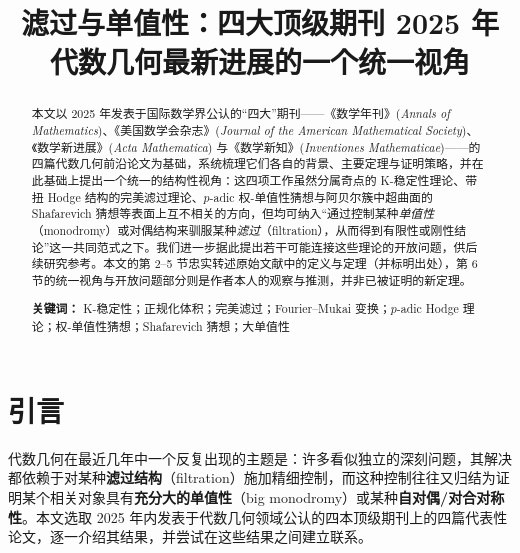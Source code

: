 \documentclass[11pt,a4paper]{article}
\title{\textbf{滤过与单值性：四大顶级期刊 2025 年代数几何最新进展的一个统一视角}}
\author{}
\date{}
\theoremstyle{definition}
\theoremstyle{remark}
\begin{document}
\maketitle
\vspace{-1.5em}

\begin{abstract}
本文以 2025 年发表于国际数学界公认的“四大”期刊——《数学年刊》(\emph{Annals of Mathematics})、《美国数学会杂志》(\emph{Journal of the American Mathematical Society})、《数学新进展》(\emph{Acta Mathematica}) 与《数学新知》(\emph{Inventiones Mathematicae})——的四篇代数几何前沿论文为基础，系统梳理它们各自的背景、主要定理与证明策略，并在此基础上提出一个统一的结构性视角：这四项工作虽然分属奇点的 K-稳定性理论、带扭 Hodge 结构的完美滤过理论、$p$-adic 权-单值性猜想与阿贝尔簇中超曲面的 Shafarevich 猜想等表面上互不相关的方向，但均可纳入“通过控制某种\emph{单值性}（monodromy）或对偶结构来驯服某种\emph{滤过}（filtration），从而得到有限性或刚性结论”这一共同范式之下。我们进一步据此提出若干可能连接这些理论的开放问题，供后续研究参考。本文的第 2–5 节忠实转述原始文献中的定义与定理（并标明出处），第 6 节的统一视角与开放问题部分则是作者本人的观察与推测，并非已被证明的新定理。

\medskip
\noindent\textbf{关键词：} K-稳定性；正规化体积；完美滤过；Fourier--Mukai 变换；$p$-adic Hodge 理论；权-单值性猜想；Shafarevich 猜想；大单值性
\end{abstract}

\tableofcontents

\section{引言}

代数几何在最近几年中一个反复出现的主题是：许多看似独立的深刻问题，其解决都依赖于对某种\textbf{滤过结构}（filtration）施加精细控制，而这种控制往往又归结为证明某个相关对象具有\textbf{充分大的单值性}（big monodromy）或某种\textbf{自对偶/对合对称性}。本文选取 2025 年内发表于代数几何领域公认的四本顶级期刊上的四篇代表性论文，逐一介绍其结果，并尝试在这些结果之间建立联系。
\end{document}
